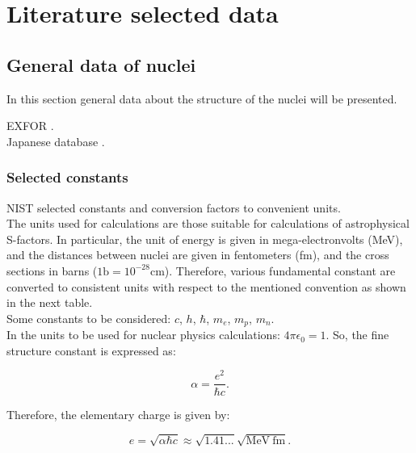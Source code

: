\documentclass[openany]{book}
\begin{document}
\appendix

\chapter{Literature selected data} \label{ap:literatureData}

\section{General data of nuclei} \label{sec:nucleiData}

In this section general data about the structure of the nuclei will be presented. 

EXFOR \cite{zerkin_pritychenko_totans_vrapcenjak_rodionov_shulyak_2022}. \\
Japanese database \cite{iwamoto_iwamoto_shibata_ichihara_kunieda_minato_nakayama_2020}.

\subsection{Selected constants}

NIST selected constants and conversion factors to convenient units. \\

The units used for calculations are those suitable for calculations of astrophysical S-factors. In particular, the unit of energy is given in mega-electronvolts (MeV), and the distances between nuclei are given in fentometers (fm), and the cross sections in barns ($\mathrm{1b = 10^{-28}cm}$). Therefore, various fundamental constant are converted to consistent units with respect to the mentioned convention as shown in the next table. \\

Some constants to be considered: $c$, $h$, $\hbar$, $m_e$, $m_p$, $m_n$. \\

In the units to be used for nuclear physics calculations: $4\pi\epsilon_0 = 1$. So, the fine structure constant is expressed as:

\begin{equation}
	\alpha = \frac{e^2}{\hbar c}.
\end{equation}

Therefore, the elementary charge is given by: 

\begin{equation}
	e = \sqrt{\alpha\hbar c} \approx \sqrt{1.41...} \sqrt{\mathrm{MeV \ fm}}.
\end{equation}
\end{document}

